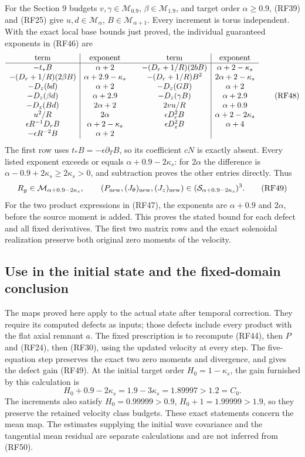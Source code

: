 \documentclass[10pt,a4paper]{article}
\begin{document}
For the Section 9 budgets
\(v,\gamma\in\mathcal M_{0.9}\),
\(\beta\in\mathcal M_{1.9}\), and target order \(\alpha\ge0.9\),
(RF39) and (RF25) give
\(u,d\in\mathcal M_\alpha\),
\(B\in\mathcal M_{\alpha+1}\). Every increment is torus
independent. With the exact local base bounds just proved, the
individual guaranteed exponents in (RF46) are
\[
\begin{array}{c|c@{\qquad}c|c}
\text{term}&\text{exponent}&\text{term}&\text{exponent}\\\hline
-t_*B&\alpha+2&-(D_r+1/R)(2bB)&\alpha+2-\kappa_s\\
-(D_r+1/R)(2\beta B)&\alpha+2.9-\kappa_s&
-(D_r+1/R)B^2&2\alpha+2-\kappa_s\\
-D_z(bd)&\alpha+2&-D_z(GB)&\alpha+2\\
-D_z(\beta d)&\alpha+2.9&-D_z(\gamma B)&\alpha+2.9\\
-D_z(Bd)&2\alpha+2&2vu/R&\alpha+0.9\\
u^2/R&2\alpha&\epsilon D_r^2B&\alpha+2-2\kappa_s\\
\epsilon R^{-1}D_rB&\alpha+2-\kappa_s&\epsilon D_z^2B&\alpha+4\\
-\epsilon R^{-2}B&\alpha+2&&
\end{array}
\tag{RF48}
\]
The first row uses \(t_*B=-\epsilon\partial_TB\), so its
coefficient \(cN\) is exactly absent. Every listed exponent exceeds
or equals \(\alpha+0.9-2\kappa_s\): for \(2\alpha\) the
difference is \(\alpha-0.9+2\kappa_s\ge2\kappa_s>0\),
and subtraction proves the other entries directly. Thus
\[
R_g\in\mathcal M_{\alpha+0.9-2\kappa_s},\qquad
(P_{\rm new},(J_\theta)_{\rm new},(J_z)_{\rm new})
\in(\mathcal S_{\alpha+0.9-2\kappa_s})^3.
\tag{RF49}
\]
For the two product expressions in (RF47), the exponents are
\(\alpha+0.9\) and \(2\alpha\), before the source moment is
added. This proves the stated bound for each defect and all fixed
derivatives. The first two matrix rows and the exact solenoidal
realization preserve both original zero moments of the velocity.

\subsection{Use in the initial state and the fixed-domain conclusion}

The maps proved here apply to the actual state after temporal correction.
They require its computed defects as inputs; those defects include every
product with the flat axial remnant \(a\). The fixed prescription is
to recompute (RF44), then \(P\) and (RF24), then (RF30), using
the updated velocity at every step. The five-equation step preserves
the exact two zero moments and divergence, and gives the defect gain
(RF49). At the initial target order \(H_0=1-\kappa_s\), the
gain furnished by this calculation is
\[
H_0+0.9-2\kappa_s=1.9-3\kappa_s=1.89997>1.2=C_0.
\tag{RF50}
\]
The increments also satisfy
\(H_0=0.99999>0.9\), \(H_0+1=1.99999>1.9\),
so they preserve the retained velocity class budgets. These exact
statements concern the mean map. The estimates supplying the initial
wave covariance and the tangential mean residual are separate
calculations and are not inferred from (RF50).
\end{document}
